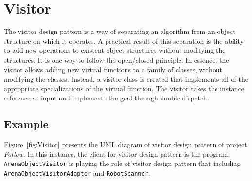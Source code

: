 \section{Visitor}

The visitor design pattern is a way of separating an algorithm from an object structure on which it operates. A practical result of this separation is the ability to add new operations to existent object structures without modifying the structures. It is one way to follow the open/closed principle. In essence, the visitor allows adding new virtual functions to a family of classes, without modifying the classes. Instead, a visitor class is created that implements all of the appropriate specializations of the virtual function. The visitor takes the instance reference as input and implements the goal through double dispatch.

\subsection*{Example}

Figure~\ref{fig:Visitor} presents the UML diagram of visitor design pattern of project \textit{Follow}. In this instance, the client for visitor design pattern is the program. \texttt{ArenaObjectVisitor} is playing the role of visitor design pattern that including \texttt{ArenaObjectVisitorAdapter} and  \texttt{RobotScanner}.

